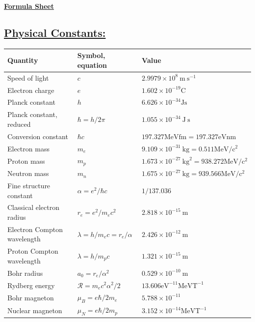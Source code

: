 \documentclass[a4paper,12pt]{article}
\begin{document}
\begin{center}\textbf{\underline{\huge{Formula Sheet}}}\end{center}
\subsection*{\underline{Physical Constants:}}
\begin{tabular}{lll}
\hline Quantity & Symbol, equation & Value \\
\hline Speed of light & $c$ & $2.9979 \times 10^{8} \mathrm{~m} \mathrm{~s}^{-1}$ \\
Electron charge & $e$ & $1.602 \times 10^{-19} \mathrm{C}$ \\
Planck constant & $h$ & $6.626 \times 10^{-34} \mathrm{Js}$ \\
Planck constant, reduced & $\hbar=h / 2 \pi$ & $1.055 \times 10^{-34} \mathrm{~J} \mathrm{~s}$ \\
Conversion constant & $\hbar c$ & $197.327 \mathrm{MeVfm}=197.327 \mathrm{eVnm}$ \\
\hline Electron mass & $m_{e}$ & $9.109 \times 10^{-31} \mathrm{~kg}=0.511 \mathrm{MeV} / \mathrm{c}^{2}$ \\
Proton mass & $m_{p}$ & $1.673 \times 10^{-27} \mathrm{~kg}^{2}=938.272 \mathrm{MeV} / \mathrm{c}^{2}$ \\
Neutron mass & $m_{n}$ & $1.675 \times 10^{-27} \mathrm{~kg}=939.566 \mathrm{MeV} / \mathrm{c}^{2}$ \\
\hline Fine structure constant & $\alpha=e^{2} / \hbar c$ & $1 / 137.036$ \\
Classical electron radius & $r_{e}=e^{2} / m_{e} c^{2}$ & $2.818 \times 10^{-15} \mathrm{~m}$ \\
Electron Compton wavelength & $\lambda=h / m_{e} c=r_{e} / \alpha$ & $2.426 \times 10^{-12} \mathrm{~m}$ \\
Proton Compton wavelength & $\lambda=h / m_{p} c$ & $1.321 \times 10^{-15} \mathrm{~m}$ \\
Bohr radius & $a_{0}=r_{e} / \alpha^{2}$ & $0.529 \times 10^{-10} \mathrm{~m}$ \\
Rydberg energy & $\mathcal{R}=m_{e} c^{2} \alpha^{2} / 2$ & $13.606 \mathrm{eV}^{-11} \mathrm{MeV} \mathrm{T}^{-1}$ \\
Bohr magneton & $\mu_{B}=e \hbar / 2 m_{e}$ & $5.788 \times 10^{-11}$ \\
Nuclear magneton & $\mu_{N}=e \hbar / 2 m_{p}$ & $3.152 \times 10^{-14} \mathrm{MeV} \mathrm{T}^{-1}$ \\

\end{tabular}
\end{document}
